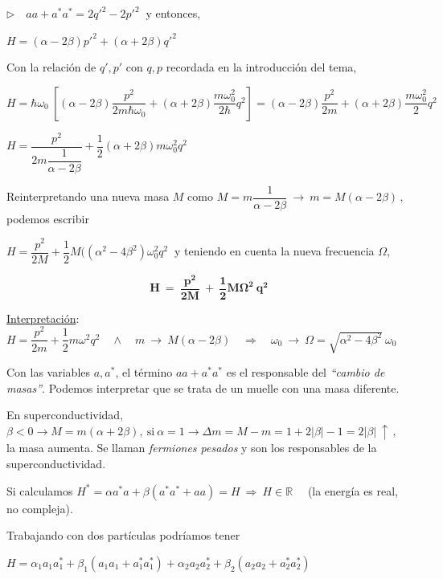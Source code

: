 $\triangleright \quad aa+a^*a^*=2q'^2-2p'^2\ $ y entonces,

$H=(\alpha-2\beta)p'^2+(\alpha+2\beta)q'^2$

Con la relación de $q',p'$ con $q,p$ recordada en la introducción del tema,

$H=\hbar \omega_0\ \left[ (\alpha-2\beta) \dfrac{p^2}{2m \hbar \omega_0} + (\alpha+2\beta)\dfrac{m\omega_0^2}{2\hbar} q^2 \right] = (\alpha-2\beta) \dfrac {p^2}{2m} + (\alpha+2\beta)\dfrac{m\omega_0^2}{2}q^2$

$H=	\dfrac{p^2}{2m\dfrac{1}{\alpha-2\beta}} + \dfrac 1 2 (\alpha+2\beta) m\omega_0^2 q^2$

Reinterpretando una nueva masa $M$ como $M=m \dfrac 1{\alpha-2\beta} \ \to \ m=M(\alpha-2\beta)\, ,  \ $ podemos escribir

$H=\dfrac{p^2}{2M}+\dfrac 1 2 M ((\alpha^2-4\beta^2)\omega_0^2 q^2\ $ y teniendo en cuenta la nueva frecuencia $\Omega$,

$$\boxed{ \  \boldsymbol{ H \ = \ \dfrac{p^2}{2M} \ + \ \dfrac 1 2 M \Omega^2\ q^2} \ }$$


\underline{Interpretación}: $H=\dfrac{p^2}{2m}+ \dfrac 1 2 m\omega^2 q^2 \quad \wedge \quad  m\ \to \ M(\alpha-2\beta) \quad \Rightarrow \quad \omega_0 \ \to \ \Omega=\sqrt{\alpha^2-4\beta^2}\ \omega_0$

Con las variables $a, a^*$, el término $aa + a^* a^*$ es el responsable del \emph{``cambio de masas''}. Podemos interpretar que se trata de un muelle con una masa diferente.

\vspace{5mm}

\begin{ejemplo}
\begin{small}
	En superconductividad, $\beta <0 \to M=m(\alpha+2\beta), \ \text{si} \ \alpha=1 \to \Delta m=M-m=1+2|\beta|-1=2|\beta| \ \uparrow\, , \ $ la masa aumenta. Se llaman \emph{fermiones pesados} y son los responsables de la superconductividad. \end{small}
\end{ejemplo}

\vspace{10mm} Si calculamos $H^*=\alpha a^*a+ \beta(a^*a^*+aa)=H \ \Rightarrow \ H\in \mathbb R \quad $ \textcolor{gris}{(la energía es real, no compleja).} 


Trabajando con dos partículas podríamos tener 

$ H=\alpha_1 a_1a_1^* + \beta_1 (a_1a_1+a_1^*a_1^*) +\alpha_2 a_2a_2^* + \beta_2 (a_2a_2+a_2^*a_2^*) $

